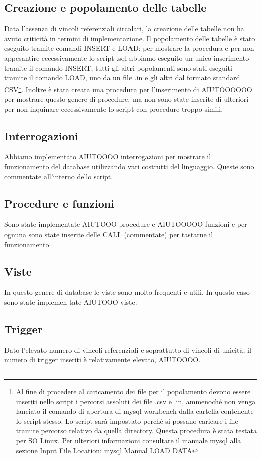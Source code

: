 \documentclass[11pt, openany]{article}
\theoremstyle{definition}
\theoremstyle{plain}
\theoremstyle{remark}
\begin{document}
		\subsection{Creazione e popolamento delle tabelle}
			Data l’assenza di vincoli referenziali circolari, la creazione delle tabelle non ha avuto criticità in termini di implementazione.
			Il popolamento delle tabelle è stato eseguito tramite comandi INSERT e LOAD: per mostrare la procedura e per non appesantire eccessivamente lo script .sql abbiamo eseguito un unico inserimento tramite il comando INSERT, tutti gli altri popolamenti sono stati eseguiti tramite il comando LOAD, uno da un file .in e gli altri dal formato standard CSV\footnote{Al fine di procedere al caricamento dei file per il popolamento devono essere inseriti nello script i percorsi assoluti dei file .csv e .in, ammenoché non venga lanciato il comando di apertura di mysql-workbench dalla cartella contenente lo script stesso.
			Lo script sarà impostato perché si possano caricare i file tramite percorso relativo da quella directory. Questa procedura è stata testata per SO Linux. Per ulteriori informazioni consultare il manuale mysql alla sezione Input File Location: \href{https://dev.mysql.com/doc/refman/8.0/en/load-data.html}{mysql Manual LOAD DATA}}. Inoltre è stata creata una procedura per l’inserimento di AIUTOOOOOO per mostrare questo genere di procedure, ma non sono state inserite di ulteriori per non inquinare eccessivamente lo script con procedure troppo simili.
			
		\subsection{Interrogazioni}
			Abbiamo implementato AIUTOOOO interrogazioni per mostrare il funzionamento del database utilizzando vari costrutti del linguaggio. Queste sono commentate all’interno dello script.
		
		\subsection{Procedure e funzioni}
			Sono state implementate AIUTOOO procedure e AIUTOOOOO funzioni e per ognuna sono state inserite delle CALL (commentate) per tastarne il funzionamento.
		
		\subsection{Viste}
			In questo genere di database le viste sono molto frequenti e utili. In questo caso sono state implemen	tate AIUTOOO viste:
		
		\subsection{Trigger}
			Dato l’elevato numero di vincoli referenziali e soprattutto di vincoli di unicità, il numero di trigger inseriti è relativamente elevato, AIUTOOOO.

	\newpage
	\hrule
	\tableofcontents
	
\end{document}
